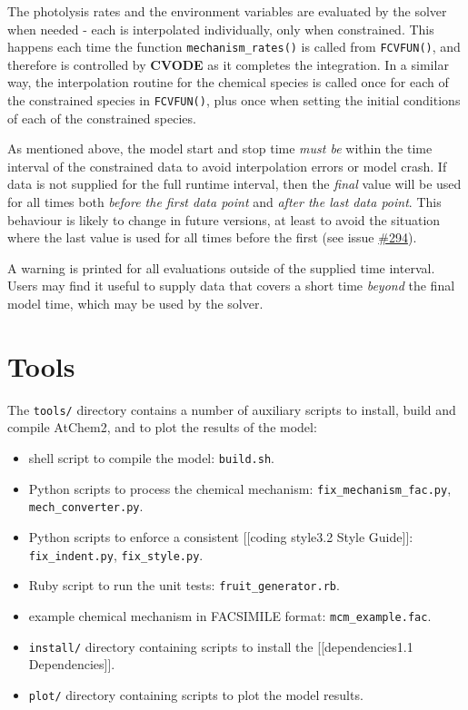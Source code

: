 The photolysis rates and the environment variables are evaluated by the
solver when needed - each is interpolated individually, only when
constrained. This happens each time the function
\texttt{mechanism\_rates()} is called from \texttt{FCVFUN()}, and
therefore is controlled by \textbf{CVODE} as it completes the
integration. In a similar way, the interpolation routine for the
chemical species is called once for each of the constrained species in
\texttt{FCVFUN()}, plus once when setting the initial conditions of each
of the constrained species.

As mentioned above, the model start and stop time \emph{must be} within
the time interval of the constrained data to avoid interpolation errors
or model crash. If data is not supplied for the full runtime interval,
then the \emph{final} value will be used for all times both \emph{before
the first data point} and \emph{after the last data point}. This
behaviour is likely to change in future versions, at least to avoid the
situation where the last value is used for all times before the first
(see issue \href{https://github.com/AtChem/AtChem2/issues/294}{\#294}).

A warning is printed for all evaluations outside of the supplied time
interval. Users may find it useful to supply data that covers a short
time \emph{beyond} the final model time, which may be used by the
solver.

\section{Tools} \label{sec:tools}

The \texttt{tools/} directory contains a number of auxiliary scripts to
install, build and compile AtChem2, and to plot the results of the
model:

\begin{itemize}
\item
  shell script to compile the model: \texttt{build.sh}.
\item
  Python scripts to process the chemical mechanism:
  \texttt{fix\_mechanism\_fac.py}, \texttt{mech\_converter.py}.
\item
  Python scripts to enforce a consistent {[}{[}coding style\textbar{}3.2
  Style Guide{]}{]}: \texttt{fix\_indent.py}, \texttt{fix\_style.py}.
\item
  Ruby script to run the unit tests: \texttt{fruit\_generator.rb}.
\item
  example chemical mechanism in FACSIMILE format:
  \texttt{mcm\_example.fac}.
\item
  \texttt{install/} directory containing scripts to install the
  {[}{[}dependencies\textbar{}1.1 Dependencies{]}{]}.
\item
  \texttt{plot/} directory containing scripts to plot the model results.
\end{itemize}

